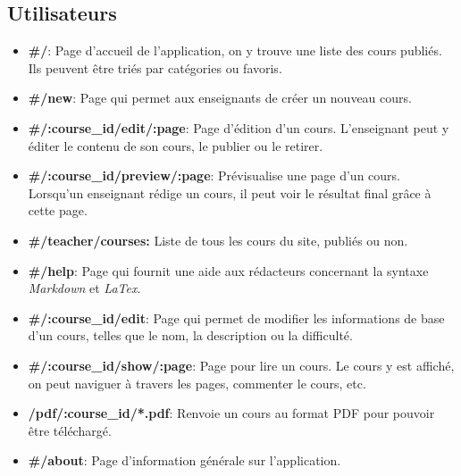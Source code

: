 \documentclass[a4paper,10pt,twoside]{sphinxmanual}
\begin{document}
\subsection{Utilisateurs}
\label{guide:utilisateurs}\begin{itemize}
\item {} 
\textbf{\#/}: Page d'accueil de l'application, on y trouve une liste des cours publiés. Ils peuvent être triés par catégories ou favoris.

\item {} 
\textbf{\#/new}: Page qui permet aux enseignants de créer un nouveau cours.

\item {} 
\textbf{\#/:course\_id/edit/:page}: Page d'édition d'un cours. L'enseignant peut y éditer le contenu de son cours, le publier ou le retirer.

\item {} 
\textbf{\#/:course\_id/preview/:page}: Prévisualise une page d'un cours. Lorsqu'un enseignant rédige un cours, il peut voir le résultat final grâce à cette page.

\item {} 
\textbf{\#/teacher/courses:} Liste de tous les cours du site, publiés ou non.

\item {} 
\textbf{\#/help}: Page qui fournit une aide aux rédacteurs concernant la syntaxe \emph{Markdown} et \emph{LaTex}.

\item {} 
\textbf{\#/:course\_id/edit}: Page qui permet de modifier les informations de base d'un cours, telles que le nom, la description ou la difficulté.

\item {} 
\textbf{\#/:course\_id/show/:page}: Page pour lire un cours. Le cours y est affiché, on peut naviguer à travers les pages, commenter le cours, etc.

\item {} 
\textbf{/pdf/:course\_id/*.pdf}: Renvoie un cours au format PDF pour pouvoir être téléchargé.

\item {} 
\textbf{\#/about}: Page d'information générale sur l'application.

\end{itemize}
\end{document}
